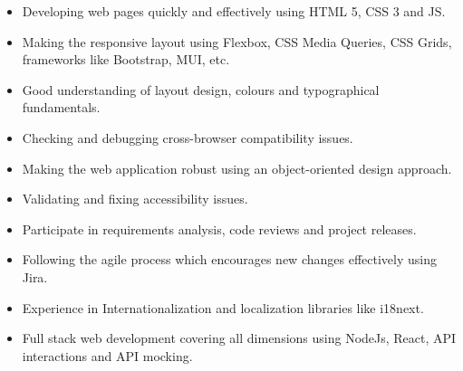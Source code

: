 %
%
%

{\begin{itemize}
    \item Developing web pages quickly and effectively using HTML 5, CSS 3 and JS.
    \item Making the responsive layout using Flexbox, CSS Media Queries, CSS Grids, frameworks like Bootstrap, MUI, etc.
    \item Good understanding of layout design, colours and typographical fundamentals.
    \item Checking and debugging cross-browser compatibility issues.
    \item Making the web application robust using an object-oriented design approach.
    \item Validating and fixing accessibility issues.
    \item Participate in requirements analysis, code reviews and project releases.
    \item Following the agile process which encourages new changes effectively using Jira.
    \item Experience in Internationalization and localization libraries like i18next.
    \item Full stack web development covering all dimensions using NodeJs, React, API interactions and API mocking.
\end{itemize}}